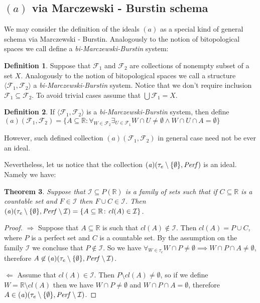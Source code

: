 \documentclass[12pt]{amsart}
\theoremstyle{plain}
\newtheorem{theorem}{Theorem}[section]
\theoremstyle{definition}
\newtheorem{definition}[theorem]{Definition}
\theoremstyle{remark}
\newcommand{\cl}{\mathit{cl}}
\newcommand{\Perf}{{\it Perf}}
\newcommand{\real}{\mathbb{R}}
\newcommand{\cF}{{\mathcal F}}
\newcommand{\cI}{{\mathcal I}}
\newcommand{\aideal}{\mathit{(a)}}
\newcommand{\biMB}{bi-Marczewski-Burstin}
\begin{document}
\subsection{$\aideal$ via Marczewski - Burstin schema}

We may consider the definition of the ideals $\aideal$
as a special kind of general schema via Marczewski - Burstin.
Analogously to the notion of bitopological spaces we call define
a {\it\biMB{}} system:

\begin{definition}
Suppose that $\cF_1$ and $\cF_2$ are collections of nonempty
subset of a set $X$. 
Analogously to the notion of bitopological spaces we call a structure
$\langle \cF_1, \cF_2 \rangle$ a {\it\biMB{}} system.
Notice that we don't require inclusion $\cF_1 \subseteq \cF_2$.
To avoid trivial cases assume that $\bigcup \cF_1 = X$.
\end{definition}

\begin{definition}
If $\langle \cF_1, \cF_2 \rangle$ is a {\it\biMB{}} system,
then define 
$\aideal(\cF_1, \cF_2) = \lbrace A \subseteq \real\colon 
\forall_{W\in \cF_2} \exists_{U \in \cF_1}
W \cap U \not= \emptyset \wedge W \cap U \cap A = \emptyset
\rbrace$ 
\end{definition}

However, such defined collection $\aideal(\cF_1, \cF_2)$
in general case need not be ever an ideal.

Nevertheless, let us notice that the collection
$\aideal(\tau_e\setminus\lbrace\emptyset\rbrace, \Perf)$ is an ideal. Namely we have:

\begin{theorem}
\label{theorem:a_tau_e_perf_i}
Suppose that $\cI \subseteq P(\real)$ is a family of sets such that 
if $C\subseteq \real$ is a countable set and $F\in\cI$ then $F \cup C \in \cI$. 
Then $\aideal(\tau_e\setminus\lbrace\emptyset\rbrace, \Perf\setminus\cI) = \lbrace A \subseteq \real \colon \cl(A) \in \cI \rbrace$.
\end{theorem}

\begin{proof}
$\Rightarrow$ Suppose that $A\subseteq \real$ is such that $\cl(A) \not\in\cI$. Then $\cl(A) = P \cup C$, where $P$ is a perfect set and $C$ is a countable set. By the assumption on the family $\cI$ we concluse that $P\not\in\cI$. So we have $\forall_{W \in \tau_e} W \cap P \not= \emptyset \implies W \cap P \cap A \not= \emptyset$, therefore $A \not\in \aideal(\tau_e\setminus\lbrace\emptyset\rbrace, \Perf\setminus\cI)$.

$\Leftarrow$ Assume that $\cl(A)\in\cI$. Then $P \setminus \cl(A) \not=\emptyset$, so if we define $W = \real\setminus\cl(A)$ then we have $W \cap P \not= \emptyset$ and $W \cap P \cap A = \emptyset$, therefore  
$A \in \aideal(\tau_e\setminus\lbrace\emptyset\rbrace, \Perf\setminus\cI)$.
\end{proof}
\end{document}
